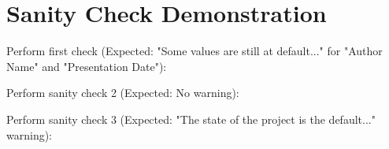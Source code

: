\documentclass{article}
\makeatletter
\def\my@actual@authorName{Author Name Placeholder} %
\def\my@actual@thesisTitle{My Awesome Thesis Title} %
\def\my@actual@presentationDate{2025-01-01} %
\makeatother
\begin{document}
\section*{Sanity Check Demonstration}
\makeatletter
Perform first check (Expected: "Some values are still at default..." for "Author Name" and "Presentation Date"):
\kthPerformSanityCheck

\par\vspace{1cm}

\def\my@actual@authorName{Gerald Maguire}
\def\my@actual@thesisTitle{My Final Thesis}
\def\my@actual@presentationDate{2025-06-12}
Perform sanity check 2 (Expected: No warning):
\kthPerformSanityCheck

\par\vspace{1cm}

\def\my@actual@authorName{Author Name Placeholder}
\def\my@actual@thesisTitle{Thesis Title Placeholder}
\def\my@actual@presentationDate{2025-01-01} 
Perform sanity check 3 (Expected: "The state of the project is the default..." warning):
\kthPerformSanityCheck
\makeatother
\end{document}
